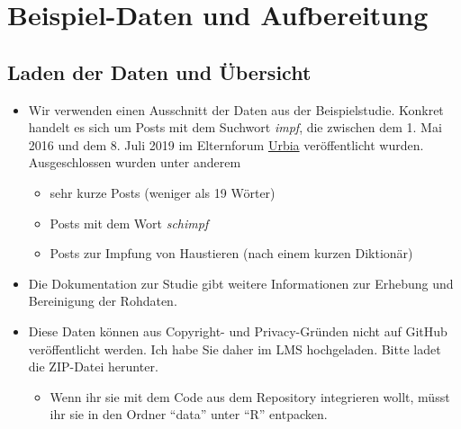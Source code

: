 \documentclass[
]{book}
\newenvironment{Shaded}{\begin{snugshade}}{\end{snugshade}}
\newcommand{\CommentTok}[1]{\textcolor[rgb]{0.56,0.35,0.01}{\textit{#1}}}
\newcommand{\DataTypeTok}[1]{\textcolor[rgb]{0.13,0.29,0.53}{#1}}
\newcommand{\DecValTok}[1]{\textcolor[rgb]{0.00,0.00,0.81}{#1}}
\newcommand{\KeywordTok}[1]{\textcolor[rgb]{0.13,0.29,0.53}{\textbf{#1}}}
\newcommand{\NormalTok}[1]{#1}
\newcommand{\OperatorTok}[1]{\textcolor[rgb]{0.81,0.36,0.00}{\textbf{#1}}}
\newcommand{\StringTok}[1]{\textcolor[rgb]{0.31,0.60,0.02}{#1}}
\providecommand{\tightlist}{%
  \setlength{\itemsep}{0pt}\setlength{\parskip}{0pt}}
\begin{document}
\hypertarget{beispiel-daten-und-aufbereitung}{%
\chapter{Beispiel-Daten und Aufbereitung}\label{beispiel-daten-und-aufbereitung}}

\hypertarget{laden-der-daten-und-uxfcbersicht}{%
\section{Laden der Daten und Übersicht}\label{laden-der-daten-und-uxfcbersicht}}

\begin{itemize}
\tightlist
\item
  Wir verwenden einen Ausschnitt der Daten aus der Beispielstudie. Konkret handelt es sich um Posts mit dem Suchwort \emph{impf}, die zwischen dem 1. Mai 2016 und dem 8. Juli 2019 im Elternforum \href{https://www.urbia.de/forum}{Urbia} veröffentlicht wurden. Ausgeschlossen wurden unter anderem

  \begin{itemize}
  \tightlist
  \item
    sehr kurze Posts (weniger als 19 Wörter)
  \item
    Posts mit dem Wort \emph{schimpf}
  \item
    Posts zur Impfung von Haustieren (nach einem kurzen Diktionär)
  \end{itemize}
\item
  Die Dokumentation zur Studie gibt weitere Informationen zur Erhebung und Bereinigung der Rohdaten.
\item
  Diese Daten können aus Copyright- und Privacy-Gründen nicht auf GitHub veröffentlicht werden. Ich habe Sie daher im LMS hochgeladen. Bitte ladet die ZIP-Datei herunter.

  \begin{itemize}
  \tightlist
  \item
    Wenn ihr sie mit dem Code aus dem Repository integrieren wollt, müsst ihr sie in den Ordner ``data'' unter ``R'' entpacken.
  \end{itemize}
\end{itemize}

\begin{Shaded}
\end{Shaded}
\end{document}
